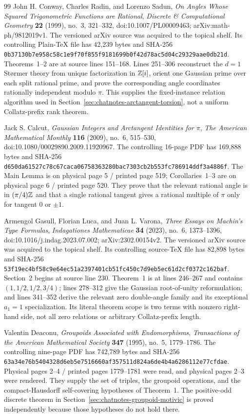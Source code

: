 \begin{thebibliography}{99}
John H. Conway, Charles Radin, and Lorenzo Sadun,
\emph{On Angles Whose Squared Trigonometric Functions are Rational},
\emph{Discrete \& Computational Geometry} \textbf{22} (1999), no.~3,
321--332, doi:10.1007/PL00009463; arXiv:math-ph/9812019v1.
The versioned arXiv source was acquired to the topical shelf.  Its controlling
Plain-\TeX{} file has 42,239 bytes and SHA-256
\nolinkurl{0b37130b7e958c58c1e9f70f855f9181699b0f42d78ac5d04c29329aae0db21d}.
Theorems~1--2 are at source lines 151--168.  Lines 251--306 reconstruct the
$d=1$ St\o rmer theory from unique factorization in $\mathbb{Z}[i]$, orient one
Gaussian prime over each split rational prime, and prove the corresponding
angle coordinates rationally independent modulo $\pi$.  This supplies the
fixed-instance relation algorithm used in
Section~\ref{sec:chatnotes-arctangent-torsion}, not a uniform Collatz-prefix
rank theorem.

Jack S. Calcut,
\emph{Gaussian Integers and Arctangent Identities for $\pi$},
\emph{The American Mathematical Monthly} \textbf{116} (2009), no.~6,
515--530, doi:10.1080/00029890.2009.11920967.
The controlling 16-page PDF has 169,888 bytes and SHA-256
\nolinkurl{d650da61527c78c67caca06758363280bac7303cb2b553fc786914ddf3a4886f}.
The Main Lemma is on physical page 5 / printed page 519; Corollaries~1--3 are
on physical page 6 / printed page 520.  They prove that the relevant rational
angle is in $(\pi/4)\mathbb{Z}$ and that a single rational tangent gives a rational
multiple of $\pi$ only for tangent $0$ or $\pm1$.

Armengol Gasull, Florian Luca, and Juan L. Varona,
\emph{Three Essays on Machin's Type Formulas},
\emph{Indagationes Mathematicae} \textbf{34} (2023), no.~6, 1373--1396,
doi:10.1016/j.indag.2023.07.002; arXiv:2302.00154v2.
The versioned arXiv source was acquired to the topical shelf.  Its controlling
source-\TeX{} file has 82,898 bytes and SHA-256
\nolinkurl{53f19ec4bf58c9e64ec51a2397401cb51fc450c7d9eb5ec61d2cf0372c162baf}.
Section~2 begins at source line 230.  Theorem~1 is at lines 246--267 and
contains $(1,1/2,1/2,3/4)$; lines 278--312 give the Gaussian root-of-unity
reformulation; and lines 341--352 derive the relevant zero double-angle
family and its exceptional $a_1=1$ specialization.  Its literal theorem scope
is two terms with nonzero right-hand side, not all zero relations or arbitrary
Collatz-prefix length.

Valentin Deaconu,
\emph{Groupoids Associated with Endomorphisms},
\emph{Transactions of the American Mathematical Society} \textbf{347}
(1995), no.~5, 1779--1786.
The controlling nine-page PDF has 742,789 bytes and SHA-256
\nolinkurl{63a34e76b5404328d6eb5e7516660af357511d824a6de4b4a6286112e77cfdae}.
Physical pages 2--4 / printed pages 1779--1781 were read, and physical pages
2--3 were rendered.  They supply the set of triples, the groupoid operations,
and the compact-Hausdorff self-covering hypotheses of Theorem~1.  The
positive-odd discrete theorem in
Section~\ref{sec:chatnotes-groupoid-motivic} is proved independently because
those hypotheses do not hold there.


\end{thebibliography}
